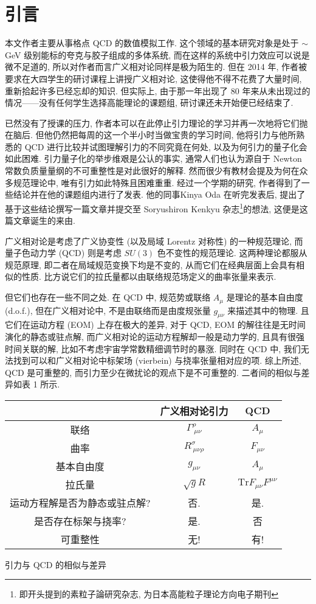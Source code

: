 \documentclass{article}
\begin{document}
\section{引言}
本文作者主要从事格点 QCD 的数值模拟工作. 这个领域的基本研究对象是处于 $\sim$GeV 级别能标的夸克与胶子组成的多体系统, 而在这样的系统中引力效应可以说是微不足道的, 所以对作者而言广义相对论同样是极为陌生的. 但在 2014 年, 作者被要求在大四学生的研讨课程上讲授广义相对论, 这使得他不得不花费了大量时间, 重新拾起许多已经忘却的知识. 但实际上, 由于那一年出现了 80 年来从未出现过的情况——没有任何学生选择高能理论的课题组, 研讨课还未开始便已经结束了.
\par
已然没有了授课的压力, 作者本可以在此停止引力理论的学习并再一次地将它们抛在脑后. 但他仍然把每周的这一个半小时当做宝贵的学习时间, 他将引力与他所熟悉的 QCD 进行比较并试图理解引力的不同究竟在何处, 以及为何引力的量子化会如此困难. 引力量子化的举步维艰是公认的事实, 通常人们也认为源自于 Newton 常数负质量量纲的不可重整性是对此很好的解释. 然而很少有教材会提及为何在众多规范理论中, 唯有引力如此特殊且困难重重. 经过一个学期的研究, 作者得到了一些结论并在他的课题组内进行了发表. 他的同事Kinya Oda 在听完发表后, 提出了基于这些结论撰写一篇文章并提交至 Soryushiron Kenkyu 杂志\footnote{即开头提到的素粒子論研究杂志, 为日本高能粒子理论方向电子期刊}的想法, 这便是这篇文章诞生的来由.
\par
广义相对论是考虑了广义协变性 (以及局域 Lorentz 对称性) 的一种规范理论, 而量子色动力学 (QCD) 则是考虑 $SU(3)$ 色不变性的规范理论. 这两种理论都服从规范原理, 即二者在局域规范变换下均是不变的, 从而它们在经典层面上会具有相似的性质. 比方说它们的拉氏量都以由联络规范场定义的曲率张量来表示.
\par
但它们也存在一些不同之处. 在 QCD 中, 规范势或联络 $A_{\mu}$ 是理论的基本自由度 (d.o.f.), 但在广义相对论中, 不是由联络而是由度规张量 $g_{\mu\nu}$ 来描述其中的物理. 且它们在运动方程 (EOM) 上存在极大的差异, 对于 QCD, EOM 的解往往是无时间演化的静态或驻点解, 而广义相对论的运动方程解却一般是动力学的, 且具有很强时间关联的解, 比如不考虑宇宙学常数精细调节时的暴涨. 同时在 QCD 中, 我们无法找到可以和广义相对论中标架场 (vierbein) 与挠率张量相对应的项. 综上所述, QCD 是可重整的, 而引力至少在微扰论的观点下是不可重整的. 二者间的相似与差异如表 1 所示.
\begin{center}
\begin{tabular}{|c|c|c|}
  \hline
   & 广义相对论引力 & QCD \\
   \hline
  联络 & $\Gamma^{\rho}_{\ \mu\nu}$ & $A_{\mu}$ \\
  曲率 & $R^{\sigma}_{\ \mu\nu\rho}$ & $F_{\mu\nu}$ \\
  基本自由度 & $g_{\mu\nu}$ & $A_{\mu}$ \\
  拉氏量 & $\sqrt{g}R$ & $\textrm{Tr}{F_{\mu\nu}F^{\mu\nu}}$ \\
  运动方程解是否为静态或驻点解? & 否. & 是. \\
  是否存在标架与挠率? & 是. & 否 \\
  可重整性 & 无! & 有! \\
  \hline
\end{tabular}
\caption{引力与 QCD 的相似与差异}
\end{center}
\end{document}

